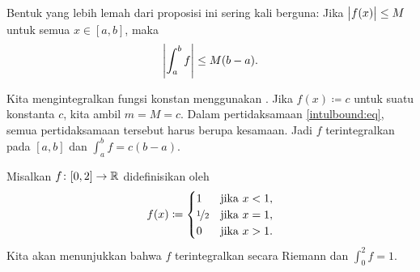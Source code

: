 Bentuk yang lebih lemah dari proposisi ini sering kali berguna:
Jika $\bigl\lvert {f(x)} \bigr\rvert \leq M$ untuk semua $x \in [a,b]$, maka
\begin{equation*}
\left\lvert {\int_a^b f} \right\rvert \leq M(b-a) .
\end{equation*}

\begin{example}
Kita mengintegralkan fungsi konstan menggunakan
.
Jika $f(x) \coloneqq c$ untuk suatu konstanta $c$, kita ambil $m = M = c$.
Dalam pertidaksamaan \eqref{intulbound:eq},
semua pertidaksamaan tersebut harus berupa kesamaan.
Jadi $f$ terintegralkan pada $[a,b]$ dan $\int_a^b f = c(b-a)$.
\end{example}

\begin{example}
Misalkan $f \colon [0,2] \to {\mathbb{R}}$ didefinisikan oleh
\begin{equation*}
f(x) \coloneqq
\begin{cases}
1               & \text{jika } x < 1,\\
\nicefrac{1}{2} & \text{jika } x = 1,\\
0               & \text{jika } x > 1.
\end{cases}
\end{equation*}
Kita akan menunjukkan bahwa $f$ terintegralkan secara Riemann dan $\int_0^2 f = 1$.


\end{example}
